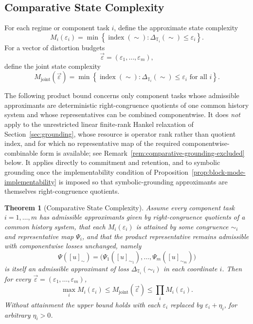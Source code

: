 \documentclass[12pt]{article}
\newtheorem{theorem}{Theorem}[section]
\theoremstyle{definition}
\begin{document}
\subsection{Comparative State Complexity}
\label{subsec:comparative}

For each regime or component task $i$, define the approximate state complexity
\[
M_i(\varepsilon_i)
=
\min
\left\{
\operatorname{index}(\sim):
\Delta_{\mathbb T_i}(\sim)\le\varepsilon_i
\right\}.
\]
For a vector of distortion budgets
\[
\vec\varepsilon=(\varepsilon_1,\dots,\varepsilon_m),
\]
define the joint state complexity
\[
M_{\mathrm{joint}}(\vec\varepsilon)
=
\min
\left\{
\operatorname{index}(\sim):
\Delta_{\mathbb T_i}(\sim)\le\varepsilon_i
\text{ for all }i
\right\}.
\]

The following product bound concerns only component tasks whose admissible
approximants are deterministic right-congruence quotients of one common
history system and whose representatives can be combined componentwise.  It
does \emph{not} apply to the unrestricted linear finite-rank Hankel
relaxation of Section~\ref{sec:grounding}, whose resource is operator rank
rather than quotient index, and for which no representative map of the
required componentwise-combinable form is available; see
Remark~\ref{rem:comparative-grounding-excluded} below.  It applies directly
to commitment and retention, and to symbolic grounding once the
implementability condition of
Proposition~\ref{prop:block-mode-implementability} is imposed so that
symbolic-grounding approximants are themselves right-congruence quotients.

\begin{theorem}[Comparative State Complexity]
\label{thm:comparative}
Assume every component task $i=1,\dots,m$ has admissible approximants given
by right-congruence quotients of a common history system, that each
$M_i(\varepsilon_i)$ is attained by some congruence $\sim_i$ and
representative map $\Psi_i$, and that the product representative remains
admissible with componentwise losses unchanged, namely
\[
\Psi([u]_\sim)
=
\bigl(
\Psi_1([u]_{\sim_1}),\dots,\Psi_m([u]_{\sim_m})
\bigr)
\]
is itself an admissible approximant of loss
$\Delta_{\mathbb T_i}(\sim_i)$ in each coordinate $i$.  Then for every
$\vec\varepsilon=(\varepsilon_1,\dots,\varepsilon_m)$,
\[
\max_i M_i(\varepsilon_i)
\le
M_{\mathrm{joint}}(\vec\varepsilon)
\le
\prod_i M_i(\varepsilon_i).
\]
Without attainment the upper bound holds with each $\varepsilon_i$ replaced
by $\varepsilon_i+\eta_i$, for arbitrary $\eta_i>0$.
\end{theorem}
\end{document}
